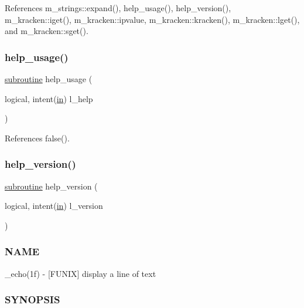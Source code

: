 References m\+\_\+strings\+::expand(), help\+\_\+usage(), help\+\_\+version(), m\+\_\+kracken\+::iget(), m\+\_\+kracken\+::ipvalue, m\+\_\+kracken\+::kracken(), m\+\_\+kracken\+::lget(), and m\+\_\+kracken\+::sget().

\mbox{\label{__echo_8f90_a3e09a3b52ee8fb04eeb93fe5761626a8}} 
\subsubsection{\texorpdfstring{help\+\_\+usage()}{help\_usage()}}
{\footnotesize\ttfamily \hyperlink{M__stopwatch_83_8txt_acfbcff50169d691ff02d4a123ed70482}{subroutine} help\+\_\+usage (\begin{DoxyParamCaption}\item[{logical, intent(\hyperlink{M__journal_83_8txt_afce72651d1eed785a2132bee863b2f38}{in})}]{l\+\_\+help }\end{DoxyParamCaption})}



References false().

\mbox{\label{__echo_8f90_a39c21619b08a3c22f19e2306efd7f766}} 
\subsubsection{\texorpdfstring{help\+\_\+version()}{help\_version()}}
{\footnotesize\ttfamily \hyperlink{M__stopwatch_83_8txt_acfbcff50169d691ff02d4a123ed70482}{subroutine} help\+\_\+version (\begin{DoxyParamCaption}\item[{logical, intent(\hyperlink{M__journal_83_8txt_afce72651d1eed785a2132bee863b2f38}{in})}]{l\+\_\+version }\end{DoxyParamCaption})}



\subsubsection*{N\+A\+ME}

\+\_\+echo(1f) -\/ \mbox{[}F\+U\+N\+IX\mbox{]} display a line of text \subsubsection*{S\+Y\+N\+O\+P\+S\+IS}


